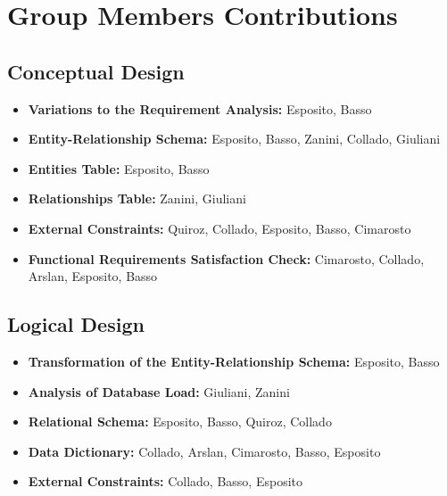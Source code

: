 \newpage
\section{Group Members Contributions}
\subsection{Conceptual Design}
\begin{itemize}
	\item \textbf{Variations to the Requirement Analysis:} Esposito, Basso
	\item \textbf{Entity-Relationship Schema:} Esposito, Basso, Zanini, Collado, Giuliani 
	\item \textbf{Entities Table:} Esposito, Basso
	\item \textbf{Relationships Table:} Zanini, Giuliani
	\item \textbf{External Constraints:} Quiroz, Collado, Esposito, Basso, Cimarosto
	\item \textbf{Functional Requirements Satisfaction Check:} Cimarosto, Collado, Arslan, Esposito, Basso
\end{itemize}
\subsection{Logical Design}
\begin{itemize}
	\item \textbf{Transformation of the Entity-Relationship Schema:} Esposito, Basso
	\item \textbf{Analysis of Database Load:} Giuliani, Zanini
	\item \textbf{Relational Schema:} Esposito, Basso, Quiroz, Collado
	\item \textbf{Data Dictionary:} Collado, Arslan, Cimarosto, Basso, Esposito
	\item \textbf{External Constraints:} Collado, Basso, Esposito
\end{itemize}	